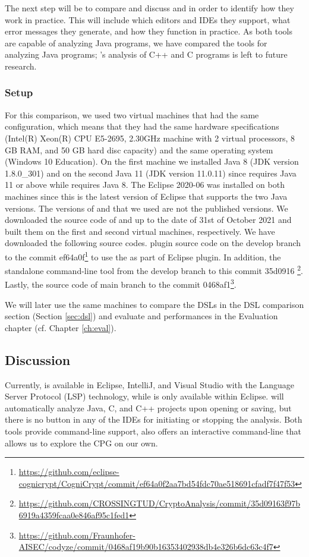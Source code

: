 The next step will be to compare and discuss \codyze{} and \cognicryptsast{} in order to identify how they work in practice. This will include which editors and IDEs they support, what error messages they generate, and how they function in practice. As both tools are capable of analyzing Java programs, we have compared the tools for analyzing Java programs; \codyze's analysis of C++ and C programs is left to future research.

\subsubsection*{Setup}
For this comparison, we used two virtual machines that had the same configuration, which means that they had the same hardware specifications (Intel(R) Xeon(R) CPU E5-2695, 2.30GHz machine with 2 virtual processors, 8 GB RAM, and 50 GB hard disc capacity) and the same operating system (Windows 10 Education). On the first machine we installed Java 8 (JDK version 1.8.0\_301) and on the second Java 11 (JDK version 11.0.11) since \codyze{} requires Java 11 or above while \cognicryptsast{} requires Java 8. The Eclipse 2020-06 was installed on both machines since this is the latest version of Eclipse that supports the two Java versions. 
The versions of \codyze{} and \cognicryptsast{} that we used are not the published versions. We downloaded the source code of \cognicryptsast{} and \codyze{} up to the date of 31st of October 2021 and built them on the first and second virtual machines, respectively. We have downloaded the following source codes.
\cognicrypt{} plugin source code on the develop branch to the commit ef64a0f\footnote{\url{https://github.com/eclipse-cognicrypt/CogniCrypt/commit/ef64a0f2aa7bd54fdc70ae518691cfadf7f47f53}} to use the \cognicryptsast{} as part of \cognicrypt{} Eclipse plugin. In addition, the \cognicryptsast{} standalone command-line tool from the develop branch to this commit 35d0916 \footnote{\url{https://github.com/CROSSINGTUD/CryptoAnalysis/commit/35d09163f97b6919a4359fcaa0e846af95c1fed1}}. Lastly, the source code of \codyze{} main branch to the commit 0468af1\footnote{\url{https://github.com/Fraunhofer-AISEC/codyze/commit/0468af19b90b16353402938db4e326b6dc63c4f7}}.

We will later use the same machines to compare the DSLs in the DSL comparison section (Section \ref{sec:dsl}) and evaluate \codyze{} and \cognicryptsast{} performances in the Evaluation chapter (cf. Chapter \ref{ch:eval}).

\subsection*{Discussion}
Currently, \codyze{} is available in Eclipse, IntelliJ, and Visual Studio with the Language Server Protocol (LSP) technology, while \cognicryptsast{} is only available within Eclipse. \codyze{} will automatically analyze Java, C, and C++ projects upon opening or saving, but there is no button in any of the IDEs for initiating or stopping the analysis. Both tools provide command-line support, \codyze{} also offers an interactive command-line that allows us to explore the CPG on our own.

